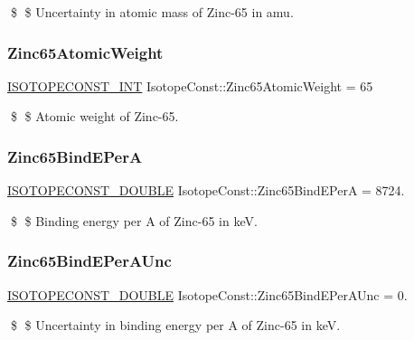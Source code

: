 \$ \$ Uncertainty in atomic mass of Zinc-\/65 in amu. \mbox{\label{group___isotope_const-_zinc-_zn65_gacd9bef977b5a9cb8e88215f2151c724b}} 
\subsubsection{\texorpdfstring{Zinc65\+Atomic\+Weight}{Zinc65AtomicWeight}}
{\footnotesize\ttfamily \mbox{\hyperlink{group___isotope_const-_macros_ga5f18360b3e99483a35c32d789e62621c}{I\+S\+O\+T\+O\+P\+E\+C\+O\+N\+S\+T\+\_\+\+I\+NT}} Isotope\+Const\+::\+Zinc65\+Atomic\+Weight = 65}

\$ \$ Atomic weight of Zinc-\/65. \mbox{\label{group___isotope_const-_zinc-_zn65_ga9a1fe90780eca0ce215d3ce3c5e62f68}} 
\subsubsection{\texorpdfstring{Zinc65\+Bind\+E\+PerA}{Zinc65BindEPerA}}
{\footnotesize\ttfamily \mbox{\hyperlink{group___isotope_const-_macros_ga8f45a7272ce02c0b4c65c44636ed719a}{I\+S\+O\+T\+O\+P\+E\+C\+O\+N\+S\+T\+\_\+\+D\+O\+U\+B\+LE}} Isotope\+Const\+::\+Zinc65\+Bind\+E\+PerA = 8724.}

\$ \$ Binding energy per A of Zinc-\/65 in keV. \mbox{\label{group___isotope_const-_zinc-_zn65_ga2fd382f12ce6741fb2107e9d946da1f4}} 
\subsubsection{\texorpdfstring{Zinc65\+Bind\+E\+Per\+A\+Unc}{Zinc65BindEPerAUnc}}
{\footnotesize\ttfamily \mbox{\hyperlink{group___isotope_const-_macros_ga8f45a7272ce02c0b4c65c44636ed719a}{I\+S\+O\+T\+O\+P\+E\+C\+O\+N\+S\+T\+\_\+\+D\+O\+U\+B\+LE}} Isotope\+Const\+::\+Zinc65\+Bind\+E\+Per\+A\+Unc = 0.}

\$ \$ Uncertainty in binding energy per A of Zinc-\/65 in keV. \mbox{\label{group___isotope_const-_zinc-_zn65_ga6258c8aff40f7656fbc474268f49cea6}} 
